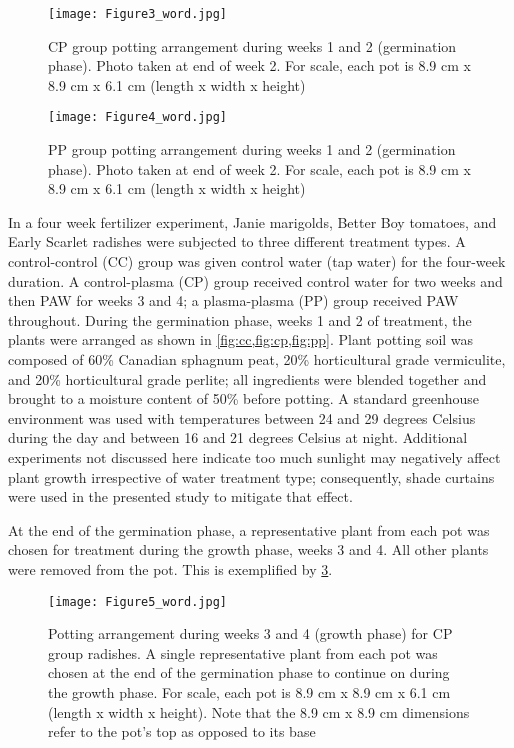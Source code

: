 \begin{figure}[htbp]
  \centering
  \texttt{[image: Figure3\_word.jpg]}
  \caption{CP group potting arrangement during weeks 1 and 2 (germination phase). Photo taken at end of week 2. For scale, each pot is 8.9 cm x 8.9 cm x 6.1 cm (length x width x height)}
  \label{fig:cp}
\end{figure}

\begin{figure}[htbp]
  \centering
  \texttt{[image: Figure4\_word.jpg]}
  \caption{PP group potting arrangement during weeks 1 and 2 (germination phase). Photo taken at end of week 2. For scale, each pot is 8.9 cm x 8.9 cm x 6.1 cm (length x width x height)}
  \label{fig:pp}
\end{figure}

In a four week fertilizer experiment, Janie marigolds, Better Boy tomatoes, and Early Scarlet radishes were subjected to three different treatment types.  A control-control (CC) group was given control water (tap water) for the four-week duration.  A control-plasma (CP) group received control water for two weeks and then PAW for weeks 3 and 4; a plasma-plasma (PP) group received PAW throughout.  During the germination phase, weeks 1 and 2 of treatment, the plants were arranged as shown in \cref{fig:cc,fig:cp,fig:pp}.  Plant potting soil was composed of 60\% Canadian sphagnum peat, 20\% horticultural grade vermiculite, and 20\% horticultural grade perlite; all ingredients were blended together and brought to a moisture content of 50\% before potting.  A standard greenhouse environment was used with temperatures between 24 and 29 degrees Celsius during the day and between 16 and 21 degrees Celsius at night.  Additional experiments not discussed here indicate too much sunlight may negatively affect plant growth irrespective of water treatment type; consequently, shade curtains were used in the presented study to mitigate that effect.

At the end of the germination phase, a representative plant from each pot was chosen for treatment during the growth phase, weeks 3 and 4.  All other plants were removed from the pot.  This is exemplified by \cref{fig:cp_growth}.

\begin{figure}[htbp]
  \centering
  \texttt{[image: Figure5\_word.jpg]}
  \caption{Potting arrangement during weeks 3 and 4 (growth phase) for CP group radishes.  A single representative plant from each pot was chosen at the end of the germination phase to continue on during the growth phase. For scale, each pot is 8.9 cm x 8.9 cm x 6.1 cm (length x width x height). Note that the 8.9 cm x 8.9 cm dimensions refer to the pot’s top as opposed to its base}
  \label{fig:cp_growth}
\end{figure}


